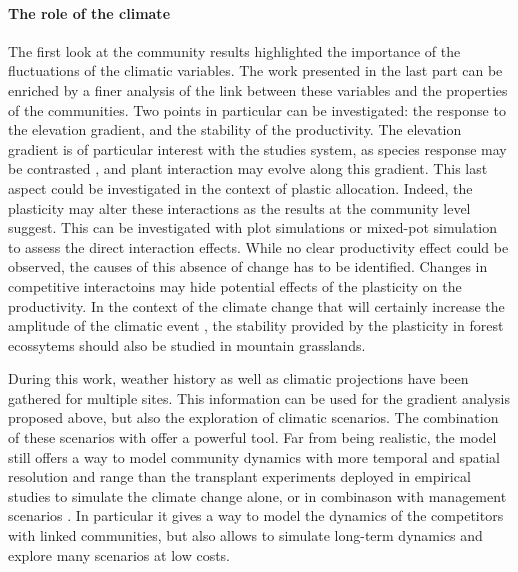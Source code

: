 \paragraph{The role of the climate}

The first look at the community results highlighted the importance of the fluctuations of the climatic variables. The work presented in the last part can be enriched by a finer analysis of the link between these variables and the properties of the communities. Two points in particular can be investigated: the response to the elevation gradient, and the stability of the productivity. The elevation gradient is of particular interest with the studies system, as species response may be contrasted  \parencite{kichenin_contrasting_2013}, and plant interaction may evolve \parencite{choler_facilitation_2001, callaway_positive_2002} along this gradient. This last aspect could be investigated in the context of plastic allocation. Indeed, the plasticity may alter these interactions as the results at the community level suggest. This can be investigated with plot simulations or mixed-pot simulation to assess the direct interaction effects. While no clear productivity effect could be observed, the causes of this absence of change has to be identified. Changes in competitive interactoins may hide potential effects of the plasticity on the productivity. In the context of the climate change that will certainly increase the amplitude of the climatic event \parencite{gobiet_21st_2014}, the stability provided by the plasticity in forest ecossytems \parencite{morin_temporal_2014} should also be studied in mountain grasslands.

During this work, weather history as well as climatic projections have been gathered for multiple sites. This information can be used for the gradient analysis proposed above, but also the exploration of climatic scenarios. The combination of these scenarios \parencite{intergovernmental_panel_on_climate_change_climate_2014} with \model offer a powerful tool. Far from being realistic, the model still offers a way to model community dynamics with more temporal and spatial resolution and range than the transplant experiments deployed in empirical studies \parencite{ishizuka_modeling_2012, wang_asymmetric_2014, grassein_importance_2014, hamann_evidence_2016} to simulate the climate change alone, or in combinason with management scenarios \parencite{deleglise_drought-induced_2015}. In particular it gives a way to model the dynamics of the competitors \parencite{alexander_novel_2015} with linked communities, but also allows to simulate long-term dynamics and explore many scenarios at low costs.

